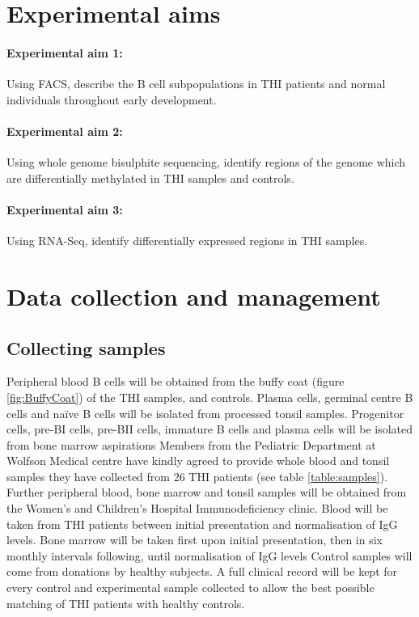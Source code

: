 \documentclass[12pt]{article}
\newcommand{\naive}{na\"{i}ve }
\begin{document}
	\section{Experimental aims}
		
		\paragraph{Experimental aim 1:} Using FACS, describe the B cell subpopulations in THI patients and normal individuals throughout early development.
		
		
		\paragraph{Experimental aim 2:} Using whole genome bisulphite sequencing, identify regions of the genome which are differentially methylated in THI samples and controls.
		
		\paragraph{Experimental aim 3:} Using RNA-Seq, identify differentially expressed regions in THI samples.

	\section{Data collection and management}
	
		\subsection{Collecting samples}
			
			Peripheral blood B cells will be obtained from the buffy coat (figure \ref{fig:BuffyCoat}) of the THI samples, and controls. 
			Plasma cells, germinal centre B cells and \naive B cells will be isolated from processed tonsil samples. 
			Progenitor cells, pre-BI cells, pre-BII cells, immature B cells and plasma cells will be isolated from bone marrow aspirations
			Members from the Pediatric Department at Wolfson Medical centre have kindly agreed to provide whole blood and tonsil samples they have collected from 26 THI patients (see table \ref{table:samples}).
			Further peripheral blood, bone marrow and tonsil samples will be obtained from the Women's and Children's Hospital Immunodeficiency clinic. 
			Blood will be taken from THI patients between initial presentation and normalisation of IgG levels.
			Bone marrow will be taken first upon initial presentation, then in six monthly intervals following, until normalisation of IgG levels
			Control samples will come from donations by healthy subjects. 
			A full clinical record will be kept for every control and experimental sample collected to allow the best possible matching of THI patients with healthy controls. 
		
\end{document}

